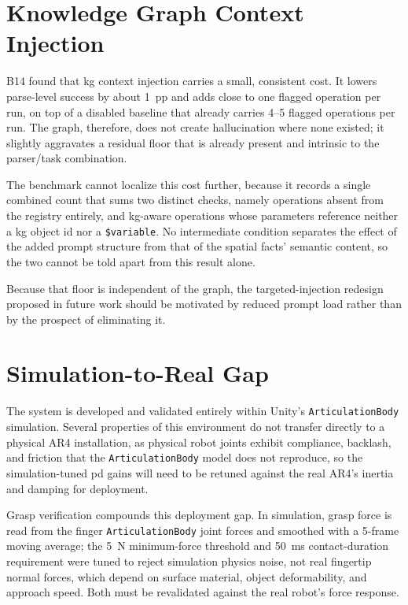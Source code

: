 \section{Knowledge Graph Context Injection}
B14 found that \gls{kg} context injection carries a small, consistent cost. It lowers parse-level success by about 1~pp and adds close to one flagged operation per run, on top of a disabled baseline that already carries 4–5 flagged operations per run. The graph, therefore, does not create hallucination where none existed; it slightly aggravates a residual floor that is already present and intrinsic to the parser/task combination.

The benchmark cannot localize this cost further, because it records a single combined count that sums two distinct checks, namely operations absent from the registry entirely, and \gls{kg}-aware operations whose parameters reference neither a \gls{kg} object id nor a \texttt{\$variable}. No intermediate condition separates the effect of the added prompt structure from that of the spatial facts’ semantic content, so the two cannot be told apart from this result alone.

Because that floor is independent of the graph, the targeted-injection redesign proposed in future work should be motivated by reduced prompt load rather than by the prospect of eliminating it.

\section{Simulation-to-Real Gap}\label{sec:sim-to-real}
The system is developed and validated entirely within Unity’s \texttt{ArticulationBody} simulation. Several properties of this environment do not transfer directly to a physical AR4 installation, as physical robot joints exhibit compliance, backlash, and friction that the \texttt{ArticulationBody} model does not reproduce, so the simulation-tuned \gls{pd} gains will need to be retuned against the real AR4’s inertia and damping for deployment.

Grasp verification compounds this deployment gap. In simulation, grasp force is read from the finger \texttt{ArticulationBody} joint forces and smoothed with a 5-frame moving average; the 5~N minimum-force threshold and 50~ms contact-duration requirement were tuned to reject simulation physics noise, not real fingertip normal forces, which depend on surface material, object deformability, and approach speed. Both must be revalidated against the real robot’s force response.

